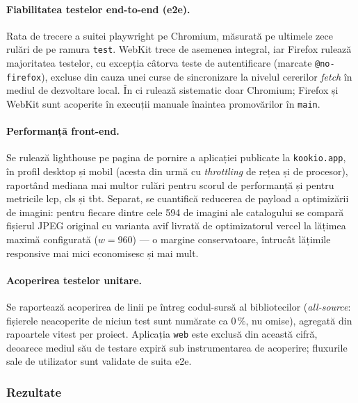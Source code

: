 \paragraph{Fiabilitatea testelor end-to-end (\acrshort{e2e}).} Rata de trecere a suitei \gls{playwright} pe Chromium, măsurată pe ultimele zece rulări de pe ramura \texttt{test}. WebKit trece de asemenea integral, iar Firefox rulează majoritatea testelor, cu excepția câtorva teste de autentificare (marcate \texttt{@no-firefox}), excluse din cauza unei curse de sincronizare la nivelul cererilor \textit{fetch} în mediul de dezvoltare local. În \acrshort{ci} rulează sistematic doar Chromium; Firefox și WebKit sunt acoperite în execuții manuale înaintea promovărilor în \texttt{main}.

\paragraph{Performanță front-end.} Se rulează \gls{lighthouse} pe pagina de pornire a aplicației publicate la \texttt{kookio.app}, în profil desktop și mobil (acesta din urmă cu \textit{throttling} de rețea și de procesor), raportând mediana mai multor rulări pentru scorul de performanță și pentru metricile \gls{lcp}, \gls{cls} și \gls{tbt}. Separat, se cuantifică reducerea de payload a optimizării de imagini: pentru fiecare dintre cele 594 de imagini ale catalogului se compară fișierul JPEG original cu varianta \gls{avif} livrată de optimizatorul \gls{vercel} la lățimea maximă configurată (\(w=960\)) --- o margine conservatoare, întrucât lățimile responsive mai mici economisesc și mai mult.

\paragraph{Acoperirea testelor unitare.} Se raportează acoperirea de linii pe întreg codul-sursă al bibliotecilor (\textit{all-source}: fișierele neacoperite de niciun test sunt numărate ca \(0\,\%\), nu omise), agregată din rapoartele \gls{vitest} per proiect. Aplicația \texttt{web} este exclusă din această cifră, deoarece mediul său de testare expiră sub instrumentarea de acoperire; fluxurile sale de utilizator sunt validate de suita \acrshort{e2e}.

\subsubsection{Rezultate}\label{subsec:rezultate}

